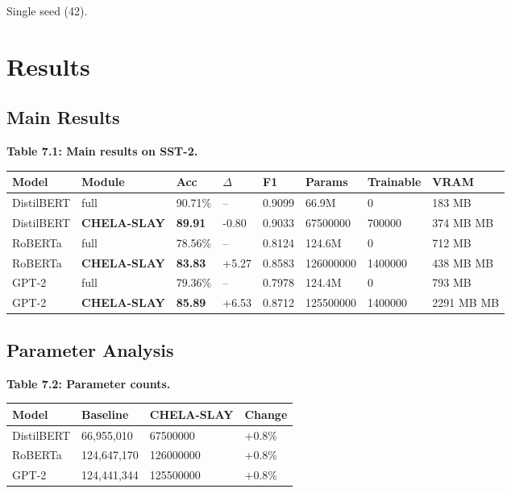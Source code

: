 Single seed (42).



\section{Results}

\subsection{Main Results}

\textbf{Table 7.1: Main results on SST-2.}

\begin{table}[H]
\centering
\small
\begin{tabular}{llllllll}
\toprule
\textbf{Model} & \textbf{Module} & \textbf{Acc} & \textbf{$\Delta$} & \textbf{F1} & \textbf{Params} & \textbf{Trainable} & \textbf{VRAM} \\
\midrule
DistilBERT & full & 90.71\% & -- & 0.9099 & 66.9M & 0 & 183 MB \\
DistilBERT & \textbf{CHELA-SLAY} & \textbf{89.91} & -0.80 & 0.9033 & 67500000 & 700000 & 374 MB MB \\
RoBERTa & full & 78.56\% & -- & 0.8124 & 124.6M & 0 & 712 MB \\
RoBERTa & \textbf{CHELA-SLAY} & \textbf{83.83} & +5.27 & 0.8583 & 126000000 & 1400000 & 438 MB MB \\
GPT-2 & full & 79.36\% & -- & 0.7978 & 124.4M & 0 & 793 MB \\
GPT-2 & \textbf{CHELA-SLAY} & \textbf{85.89} & +6.53 & 0.8712 & 125500000 & 1400000 & 2291 MB MB \\
\bottomrule
\end{tabular}
\end{table}

\subsection{Parameter Analysis}

\textbf{Table 7.2: Parameter counts.}

\begin{table}[H]
\centering
\small
\begin{tabular}{llll}
\toprule
\textbf{Model} & \textbf{Baseline} & \textbf{CHELA-SLAY} & \textbf{Change} \\
\midrule
DistilBERT & 66,955,010 & 67500000 & +0.8\% \\
RoBERTa & 124,647,170 & 126000000 & +0.8\% \\
GPT-2 & 124,441,344 & 125500000 & +0.8\% \\
\bottomrule
\end{tabular}
\end{table}

